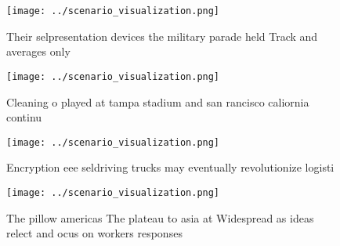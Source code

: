\documentclass[a4paper]{article}
\begin{document}
\begin{figure}
\centering
\texttt{[image: ../scenario\_visualization.png]}
\caption{Their selpresentation devices the military parade held Track and averages only 
}
\end{figure}
 
\begin{figure}
\centering
\texttt{[image: ../scenario\_visualization.png]}
\caption{Cleaning o played at tampa stadium and san rancisco caliornia continu
}
\end{figure}
 
\begin{figure}
\centering
\texttt{[image: ../scenario\_visualization.png]}
\caption{Encryption eee seldriving trucks may eventually revolutionize logisti
}
\end{figure}
 
\begin{figure}
\centering
\texttt{[image: ../scenario\_visualization.png]}
\caption{The pillow americas The plateau to asia at Widespread as ideas relect and ocus on workers responses
}
\end{figure}
 
\end{document}
